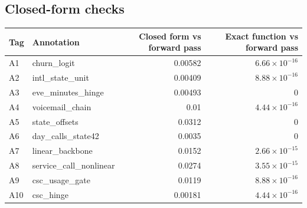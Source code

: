\begin{drafted}
\subsection{Closed-form checks}\label{app:churn100-s2-c1:closedform}
{\small\noindent\begin{tabularx}{\linewidth}{@{}lXrr@{}}
\toprule Tag & Annotation & Closed form vs forward pass & Exact function vs forward pass \\ \midrule
A1 & churn\_\allowbreak{}logit & 0.00582 & $6.66\times 10^{-16}$ \\
A2 & intl\_\allowbreak{}state\_\allowbreak{}unit & 0.00409 & $8.88\times 10^{-16}$ \\
A3 & eve\_\allowbreak{}minutes\_\allowbreak{}hinge & 0.00493 & 0 \\
A4 & voicemail\_\allowbreak{}chain & 0.01 & $4.44\times 10^{-16}$ \\
A5 & state\_\allowbreak{}offsets & 0.0312 & 0 \\
A6 & day\_\allowbreak{}calls\_\allowbreak{}state42 & 0.0035 & 0 \\
A7 & linear\_\allowbreak{}backbone & 0.0152 & $2.66\times 10^{-15}$ \\
A8 & service\_\allowbreak{}call\_\allowbreak{}nonlinear & 0.0274 & $3.55\times 10^{-15}$ \\
A9 & csc\_\allowbreak{}usage\_\allowbreak{}gate & 0.0119 & $8.88\times 10^{-16}$ \\
A10 & csc\_\allowbreak{}hinge & 0.00181 & $4.44\times 10^{-16}$ \\
\bottomrule
\end{tabularx}\par}

\end{drafted}
